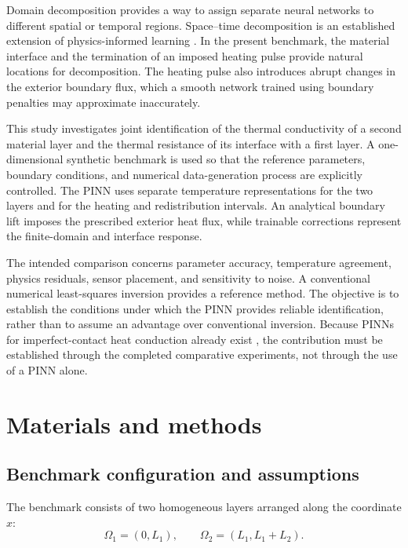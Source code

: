 \documentclass[11pt,a4paper]{article}
\begin{document}
Domain decomposition provides a way to assign separate neural
networks to different spatial or temporal regions.
Space--time decomposition is an established extension of
physics-informed learning \citep{jagtap2020}.
In the present benchmark, the material interface and the
termination of an imposed heating pulse provide natural
locations for decomposition. The heating pulse also introduces
abrupt changes in the exterior boundary flux, which a smooth
network trained using boundary penalties may approximate
inaccurately.

This study investigates joint identification of the thermal
conductivity of a second material layer and the thermal
resistance of its interface with a first layer. A one-dimensional
synthetic benchmark is used so that the reference parameters,
boundary conditions, and numerical data-generation process
are explicitly controlled. The PINN uses separate temperature
representations for the two layers and for the heating and
redistribution intervals. An analytical boundary lift imposes
the prescribed exterior heat flux, while trainable corrections
represent the finite-domain and interface response.

The intended comparison concerns parameter accuracy,
temperature agreement, physics residuals, sensor placement,
and sensitivity to noise. A conventional numerical
least-squares inversion provides a reference method.
The objective is to establish the conditions under which the
PINN provides reliable identification, rather than to assume
an advantage over conventional inversion.
Because PINNs for imperfect-contact heat conduction already
exist \citep{oh2025}, the contribution must be established
through the completed comparative experiments, not through
the use of a PINN alone.

\section{Materials and methods}

\subsection{Benchmark configuration and assumptions}

The benchmark consists of two homogeneous layers arranged
along the coordinate $x$:
\begin{equation}
\Omega_1=(0,L_1),
\qquad
\Omega_2=(L_1,L_1+L_2).
\end{equation}
\end{document}

